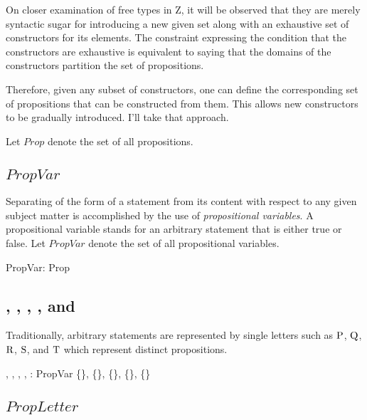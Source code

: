 \documentclass[11pt, oneside]{article}
\begin{document}
On closer examination of free types in Z, it will be observed that they are merely syntactic sugar for introducing a new given set
along with an exhaustive set of constructors for its elements.
The constraint expressing the condition that the constructors are exhaustive is equivalent to saying that the domains of the constructors
partition the set of propositions.

Therefore, given any subset of constructors, one can define the corresponding set of propositions that can be constructed from them.
This allows new constructors to be gradually introduced.
I'll take that approach.

Let $Prop$ denote the set of all propositions.

\begin{zed}
	[Prop]
\end{zed}

\subsection{$PropVar$}

Separating of the form of a statement from its content with respect to any given subject matter is accomplished by 
the use of {\it propositional variables}. 
A propositional variable stands for an arbitrary statement that is either true or false.
Let $PropVar$ denote the set of all propositional variables.

\begin{axdef}
	PropVar: \power Prop
\end{axdef}

\subsection{, , , , and }

Traditionally, arbitrary statements are represented by single letters such as
$\mathrm{P}$, $\mathrm{Q}$, $\mathrm{R}$, $\mathrm{S}$, and $\mathrm{T}$ which represent distinct propositions.

\begin{axdef}
	\propP, \propQ, \propR, \propS, \propT: PropVar
\where
	\disjoint \langle \{\propP\}, \{\propQ\}, \{\propR\}, \{\propS\}, \{\propT\} \rangle
\end{axdef}

\subsection{$PropLetter$}
\end{document}
